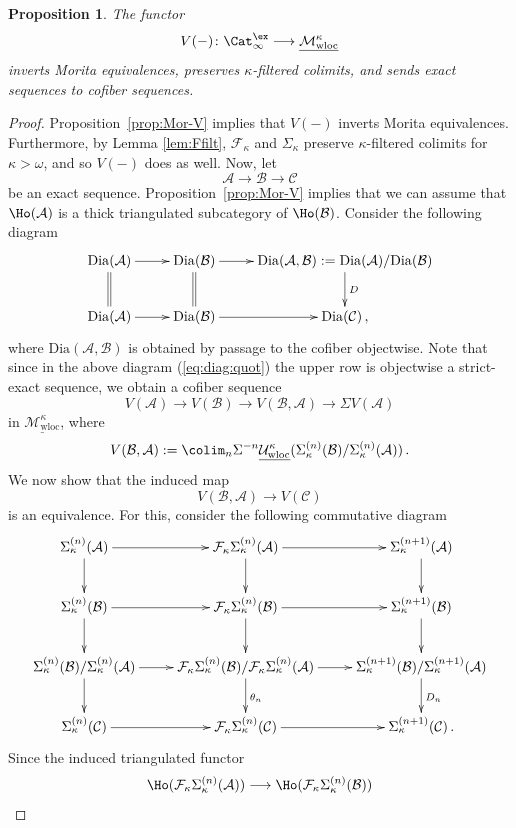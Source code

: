 \documentclass{amsart}
\newcommand{\cA}{{\mathcal A}}
\newcommand{\cB}{{\mathcal B}}
\newcommand{\cC}{{\mathcal C}}
\newcommand{\cF}{{\mathcal F}}
\newcommand{\cM}{{\mathcal M}}
\newcommand{\cU}{{\mathcal U}}
\let\catsymbfont\mathcal
\newcommand{\aA}{{\catsymbfont{A}}}
\newcommand{\aB}{{\catsymbfont{B}}}
\newcommand{\aC}{{\catsymbfont{C}}}
\newcommand{\stabcat}{\Cat_\i^{\ex}}
\newcommand{\too}{\longrightarrow}%
\renewcommand{\i}{\infty}
\newcommand{\uwMotloc}{\underline{\cM_{\mathrm{wloc}}^\kappa}}
\newcommand{\uwUloc}{\underline{\cU_{\mathrm{wloc}}^\kappa}}
\newcommand{\kcone}{\cF_{\kappa}}
\newcommand{\ksusp}{\Sigma_{\kappa}}
\numberwithin{equation}{section}
\newtheorem{proposition}[equation]{Proposition}
\theoremstyle{definition}
\begin{document}
\begin{proposition}\label{prop:V-loc}
The functor
\[
V(-) \colon \stabcat \too \uwMotloc
\]
inverts Morita equivalences, preserves $\kappa$-filtered colimits, and
sends exact sequences to cofiber sequences. 
\end{proposition}
\begin{proof}
Proposition~\ref{prop:Mor-V} implies that $V(-)$ inverts Morita
equivalences.  Furthermore, by Lemma \ref{lem:Ffilt}, $\kcone$ and $\ksusp$ preserve
$\kappa$-filtered colimits for $\kappa > \omega$,
and so $V(-)$ does as well. Now, let
\[
\cA \too \cB \too \cC
\]
be an exact sequence.  Proposition~\ref{prop:Mor-V} implies that we
can assume that $\Ho(\cA)$ is a thick triangulated subcategory of
$\Ho(\cB)$. Consider the following diagram
\begin{equation}\label{eq:diag:quot}
\xymatrix{
\mathrm{Dia}(\cA) \ar@{=}[d] \ar[r] & \mathrm{Dia}(\cB) \ar@{=}[d] \ar[r] & \mathrm{Dia}(\cA,\cB) := \mathrm{Dia}(\cA)/\mathrm{Dia}(\cB) \ar[d]^D \\
\mathrm{Dia}(\cA) \ar[r] & \mathrm{Dia}(\cB) \ar[r] & \mathrm{Dia}(\cC)\,,
}
\end{equation}
where $\mathrm{Dia}(\cA, \cB)$ is obtained by passage to the cofiber
objectwise. Note that since in the above diagram (\ref{eq:diag:quot})
the upper row is objectwise a strict-exact sequence, we obtain a
cofiber sequence
$$ V(\cA) \too V(\cB) \too V(\cB, \cA) \too \Sigma V(\cA)$$
in $\uwMotloc$, where
$$ V(\cB, \cA):= \colim_n\Sigma^{-n}\uwUloc (\ksusp^{(n)}(\cB)/\ksusp^{(n)}(\cA))\,.$$
We now show that the induced map
\begin{equation}\label{keymorph}
V(\aB,\aA)\too V(\aC)
\end{equation}
is an equivalence. For this,
consider the following commutative diagram
$$
\xymatrix{
\ksusp^{(n)}(\cA) \ar[d] \ar[r] & \kcone\ksusp^{(n)}(\cA) \ar[d] \ar[r] & \ksusp^{(n+1)}(\cA) \ar[d] \\
\ksusp^{(n)}(\cB) \ar[d] \ar[r] & \kcone\ksusp^{(n)}(\cB) \ar[d] \ar[r] & \ksusp^{(n+1)}(\cB) \ar[d] \\
\ksusp^{(n)}(\cB)/\ksusp^{(n)}(\cA)  \ar[d] \ar[r] & \kcone\ksusp^{(n)}(\cB)/\kcone\ksusp^{(n)}(\cA)  \ar[d]^{\theta_n} \ar[r] & \ksusp^{(n+1)}(\cB)/\ksusp^{(n+1)}(\cA) \ar[d]^{D_n} \\
\ksusp^{(n)}(\cC) \ar[r] & \kcone\ksusp^{(n)}(\cC) \ar[r] & \ksusp^{(n+1)}(\cC)\,. \\
}
$$
Since the induced triangulated functor
$$ \Ho (\kcone \ksusp^{(n)}(\cA)) \too \Ho (\kcone \ksusp^{(n)}(\cB))$$

\end{proof}
\end{document}
